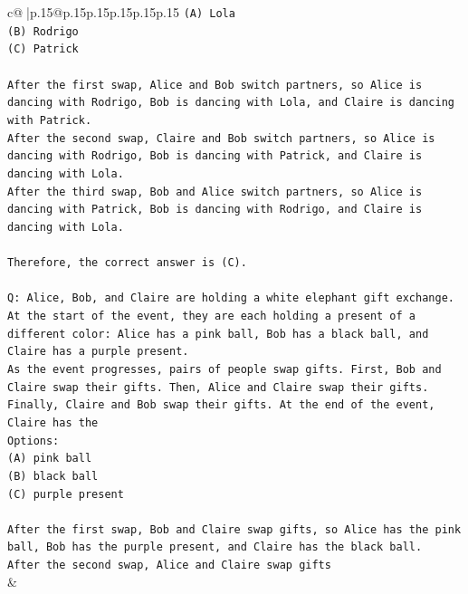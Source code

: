 \documentclass{article}
\begin{document}
{\begin{supertabular}{c@{$\;$}|p{.15\linewidth}@{}p{.15\linewidth}p{.15\linewidth}p{.15\linewidth}p{.15\linewidth}p{.15\linewidth}}
{{{\texttt{(A) Lola} \\
\texttt{(B) Rodrigo} \\
\texttt{(C) Patrick} \\
\\ 
\texttt{After the first swap, Alice and Bob switch partners, so Alice is dancing with Rodrigo, Bob is dancing with Lola, and Claire is dancing with Patrick.} \\
\texttt{After the second swap, Claire and Bob switch partners, so Alice is dancing with Rodrigo, Bob is dancing with Patrick, and Claire is dancing with Lola.} \\
\texttt{After the third swap, Bob and Alice switch partners, so Alice is dancing with Patrick, Bob is dancing with Rodrigo, and Claire is dancing with Lola.} \\
\\ 
\texttt{Therefore, the correct answer is (C).} \\
\\ 
\texttt{Q: Alice, Bob, and Claire are holding a white elephant gift exchange. At the start of the event, they are each holding a present of a different color: Alice has a pink ball, Bob has a black ball, and Claire has a purple present.} \\
\texttt{As the event progresses, pairs of people swap gifts. First, Bob and Claire swap their gifts. Then, Alice and Claire swap their gifts. Finally, Claire and Bob swap their gifts. At the end of the event, Claire has the} \\
\texttt{Options:} \\
\texttt{(A) pink ball} \\
\texttt{(B) black ball} \\
\texttt{(C) purple present} \\
\\ 
\texttt{After the first swap, Bob and Claire swap gifts, so Alice has the pink ball, Bob has the purple present, and Claire has the black ball.} \\
\texttt{After the second swap, Alice and Claire swap gifts} \\
            }
        }
    }
    & \\ \\


\end{supertabular}}
\end{document}
